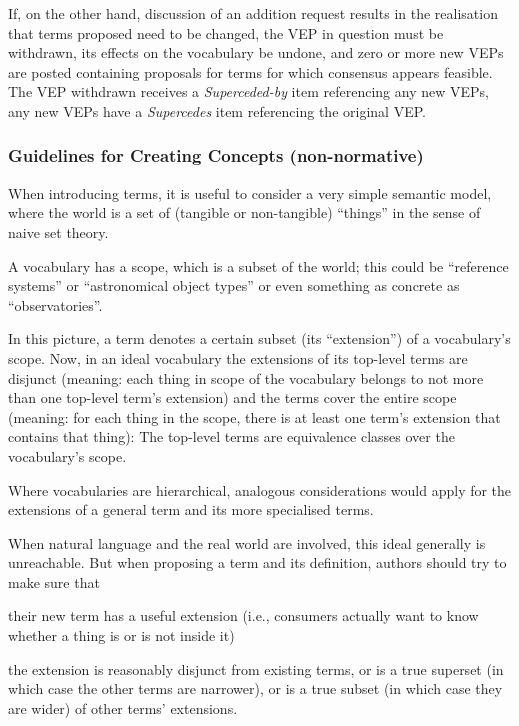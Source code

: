 \documentclass[11pt,a4paper]{ivoa}
\newcommand{\vepitem}[1]{\emph{#1}}
\begin{document}
If, on the other hand, discussion of an addition request results in the
realisation that terms proposed need to be changed, the VEP in question
must be withdrawn, its effects on the vocabulary be undone, and zero or
more new VEPs are posted containing proposals for terms for which
consensus appears feasible.  The VEP withdrawn receives a
\vepitem{Superceded-by} item referencing any new VEPs, any new VEPs have
a \vepitem{Supercedes} item referencing the original VEP.

\subsubsection{Guidelines for Creating Concepts (non-normative)}

When introducing terms, it is useful to consider a very simple
semantic model, where the world is a set of (tangible or non-tangible)
``things'' in the sense of naive set theory.

A vocabulary has a scope, which is a subset of the world; this could be
``reference systems'' or ``astronomical object types'' or even something
as concrete as ``observatories''.

In this picture, a term denotes a certain subset (its ``extension'') of
a vocabulary's scope.  Now, in an ideal vocabulary the extensions of its
top-level terms are disjunct (meaning: each thing in scope of the vocabulary
belongs to not more than one top-level term's extension) and the terms cover the
entire scope (meaning: for each thing in the scope, there is at least
one term's extension that contains that thing): The top-level terms are
equivalence classes over the vocabulary's scope.

Where vocabularies are hierarchical, analogous considerations would
apply for the extensions of a general term and its more specialised
terms.

When natural language and the real world are involved, 
this ideal generally is unreachable.
But when proposing a term and its definition, authors should try to
make sure that 

\begin{compactenum}
\item their new term has a useful extension (i.e., consumers actually
want to know whether a thing is or is not inside it)
\item the extension is reasonably disjunct from existing terms, or is a
true superset (in which case the other terms are narrower), or is a true
subset (in which case they are wider) of other terms' extensions.
\end{compactenum}
\end{document}
